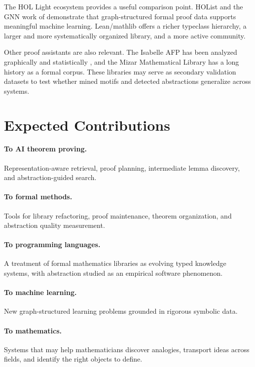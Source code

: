 \documentclass[12pt, a4paper]{article}
\begin{document}
The HOL Light ecosystem provides a useful comparison point. HOList
\citep{bansal2019holist} and the GNN work of \citet{paliwal2020graph}
demonstrate that graph-structured formal proof data supports meaningful
machine learning. Lean/mathlib offers a richer typeclass hierarchy, a larger
and more systematically organized library, and a more active community.

Other proof assistants are also relevant. The Isabelle AFP has been analyzed
graphically \citep{huch2022} and statistically \citep{blanchette2015mining},
and the Mizar Mathematical Library has a long history as a formal corpus.
These libraries may serve as secondary validation datasets to test whether
mined motifs and detected abstractions generalize across systems.

\section{Expected Contributions}

\paragraph{To AI theorem proving.}
Representation-aware retrieval, proof planning, intermediate lemma discovery,
and abstraction-guided search.

\paragraph{To formal methods.}
Tools for library refactoring, proof maintenance, theorem organization, and
abstraction quality measurement.

\paragraph{To programming languages.}
A treatment of formal mathematics libraries as evolving typed knowledge
systems, with abstraction studied as an empirical software phenomenon.

\paragraph{To machine learning.}
New graph-structured learning problems grounded in rigorous symbolic data.

\paragraph{To mathematics.}
Systems that may help mathematicians discover analogies, transport ideas
across fields, and identify the right objects to define.
\end{document}
